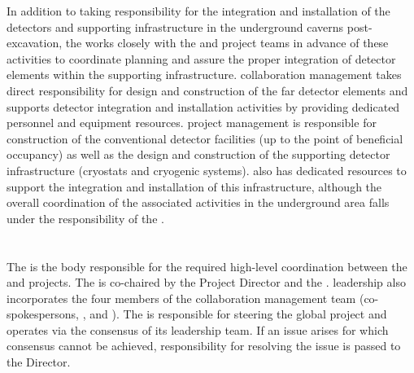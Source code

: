 In addition to taking responsibility for the integration and
installation of the detectors and supporting 
infrastructure in the underground caverns post-excavation, the
 works closely with the  and 
project teams in advance of these activities to coordinate planning
and assure the proper integration of detector elements within the
supporting infrastructure.   collaboration management
takes direct responsibility for design and construction of the far
detector elements and supports detector integration and installation
activities by providing dedicated personnel and equipment resources.
 project management is responsible for construction of the
conventional detector facilities (up to the point of beneficial
occupancy) as well as the design and construction of the supporting
detector infrastructure (cryostats and cryogenic systems).  also
has dedicated resources to support the integration and installation of
this infrastructure, although the overall coordination of the
associated activities in the underground area falls under the
responsibility of the .

\section{}
\label{sec:efig}

The  is the body responsible for the required high-level
coordination between the  and  projects.  The
 is co-chaired by the  Project Director and
the .  leadership also incorporates the four
members of the  collaboration management team
(co-spokespersons, , and ).  The
 is responsible for steering the global project and
operates via the consensus of its leadership team.  If an issue arises
for which consensus cannot be achieved, responsibility for resolving
the issue is passed to the \fnal Director.

\section{}
\label{sec:jpo}

